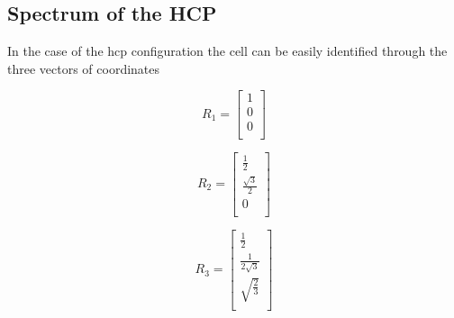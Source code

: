 \documentclass[a4paper]{article}
\begin{document}
\subsection{Spectrum of the HCP}

In the case of the hcp configuration the cell can be easily identified through the three vectors of coordinates\\
\begin{minipage}{0.3\textwidth}
\centering
\begin{equation*}
R_1 =
\begin{bmatrix}
	1 \\
    0 \\
    0 \\
    
\end{bmatrix}
\end{equation*}

\end{minipage}
\begin{minipage}{0.3\textwidth}
\centering
\begin{equation*}
R_2 =
\begin{bmatrix}
    \frac{1}{2} \\
    \frac{\sqrt{3}}{2}  \\
    0 \\
\end{bmatrix}
\end{equation*}
\end{minipage}
\begin{minipage}{0.3\textwidth}
\centering
\begin{equation*}
R_3 =
\begin{bmatrix}
    \frac{1}{2} \\
    \frac{1}{2\sqrt{3}}  \\
    \sqrt{\frac{2}{3}} \\
\end{bmatrix}
\end{equation*}
\end{minipage}
\end{document}
